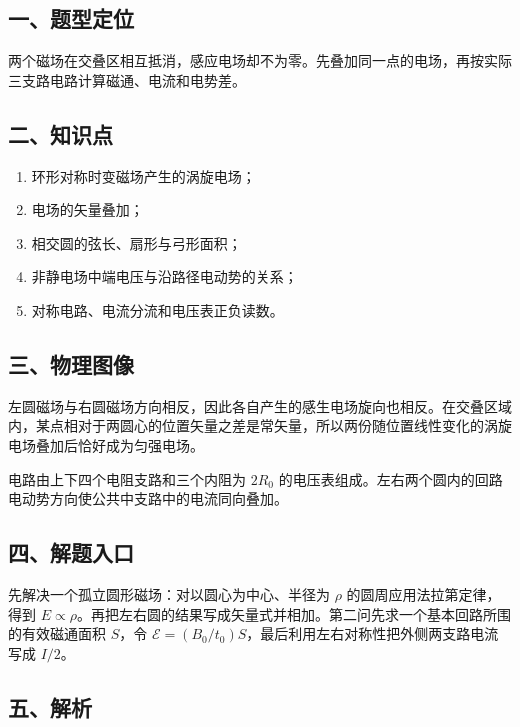 \documentclass[12pt,a4paper,UTF8]{ctexart}
\newcommand{\tightlist}{\setlength{\itemsep}{0pt}\setlength{\parskip}{0pt}}
\begin{document}
\subsection{一、题型定位}\label{ux4e00ux9898ux578bux5b9aux4f4d-1}

两个磁场在交叠区相互抵消，感应电场却不为零。先叠加同一点的电场，再按实际三支路电路计算磁通、电流和电势差。

\subsection{二、知识点}\label{ux4e8cux77e5ux8bc6ux70b9-1}

\begin{enumerate}
\def\labelenumi{\arabic{enumi}.}
\tightlist
\item
  环形对称时变磁场产生的涡旋电场；
\item
  电场的矢量叠加；
\item
  相交圆的弦长、扇形与弓形面积；
\item
  非静电场中端电压与沿路径电动势的关系；
\item
  对称电路、电流分流和电压表正负读数。
\end{enumerate}

\subsection{三、物理图像}\label{ux4e09ux7269ux7406ux56feux50cf-1}

左圆磁场与右圆磁场方向相反，因此各自产生的感生电场旋向也相反。在交叠区域内，某点相对于两圆心的位置矢量之差是常矢量，所以两份随位置线性变化的涡旋电场叠加后恰好成为匀强电场。

电路由上下四个电阻支路和三个内阻为 \(2R_0\)
的电压表组成。左右两个圆内的回路电动势方向使公共中支路中的电流同向叠加。

\subsection{四、解题入口}\label{ux56dbux89e3ux9898ux5165ux53e3-1}

先解决一个孤立圆形磁场：对以圆心为中心、半径为 \(\rho\)
的圆周应用法拉第定律，得到
\(E\propto\rho\)。再把左右圆的结果写成矢量式并相加。第二问先求一个基本回路所围的有效磁通面积
\(S\)，令
\(\mathcal E=(B_0/t_0)S\)，最后利用左右对称性把外侧两支路电流写成
\(I/2\)。

\subsection{五、解析}\label{ux4e94ux89e3ux6790-1}
\end{document}
